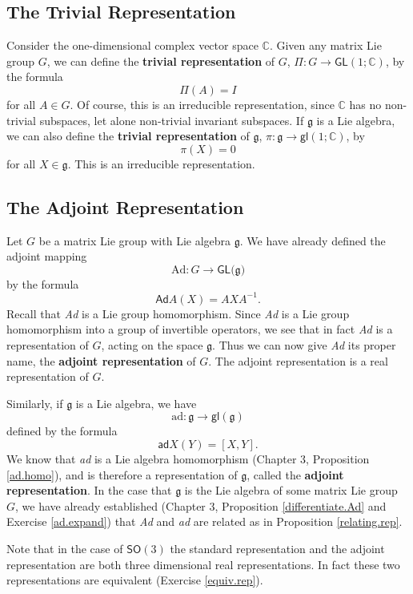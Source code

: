 \documentclass{amsbook}
\let \frak = \mathfrak
\theoremstyle{plain}
\numberwithin{equation}{chapter}
\numberwithin{theorem}{chapter}
\begin{document}
\subsection{The Trivial Representation}

Consider the one-dimensional complex vector space $\mathbb{C}$. Given any
matrix Lie group $G$, we can define the \textbf{trivial representation} of $G
$, $\Pi:G\rightarrow\mathsf{GL}(1;\mathbb{C})$, by the formula
\[
\Pi(A)=I
\]
for all $A\in G$. Of course, this is an irreducible representation, since
$\mathbb{C}$ has no non-trivial subspaces, let alone non-trivial invariant
subspaces. If $\frak{g}$ is a Lie algebra, we can also define the
\textbf{trivial representation} of $\frak{g}$, $\pi:\frak{g}\rightarrow
\mathsf{gl}(1;\mathbb{C})$, by
\[
\pi(X)=0
\]
for all $X\in\frak{g}$. This is an irreducible representation.

\subsection{The Adjoint Representation}

Let $G$ be a matrix Lie group with Lie algebra $\frak{g}$. We have already
defined the adjoint mapping
\[
\mathrm{Ad}:G\rightarrow\mathsf{GL}(\frak{g)}%
\]
by the formula
\[
\mathsf{Ad}A(X)=AXA^{-1}\text{.}%
\]
Recall that \textit{Ad} is a Lie group homomorphism. Since \textit{Ad} is a
Lie group homomorphism into a group of invertible operators, we see that in
fact \textit{Ad} is a representation of $G$, acting on the space $\frak{g}$.
Thus we can now give \textit{Ad} its proper name, the \textbf{adjoint
representation} of $G$. The adjoint representation is a real representation of
$G$.

Similarly, if $\frak{g}$ is a Lie algebra, we have
\[
\mathrm{ad}:\frak{g}\rightarrow\mathsf{gl}(\frak{g})
\]
defined by the formula
\[
\mathsf{ad}X(Y)=[X,Y]\text{.}%
\]
We know that \textit{ad} is a Lie algebra homomorphism (Chapter 3, Proposition
\ref{ad.homo}), and is therefore a representation of $\frak{g}$, called the
\textbf{adjoint representation}. In the case that $\frak{g}$ is the Lie
algebra of some matrix Lie group $G$, we have already established (Chapter 3,
Proposition \ref{differentiate.Ad} and Exercise \ref{ad.expand}) that
\textit{Ad} and \textit{ad} are related as in Proposition \ref{relating.rep}.

Note that in the case of $\mathsf{SO}(3)$ the standard representation and the
adjoint representation are both three dimensional real representations. In
fact these two representations are equivalent (Exercise \ref{equiv.rep}).
\end{document}
